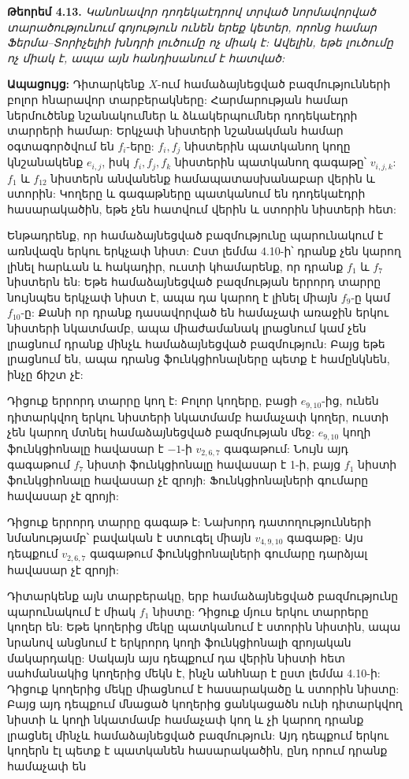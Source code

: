 \documentclass[12pt,a4paper]{article}
\numberwithin{equation}{section}
\numberwithin{figure}{section}
\begin{document}
\textbf{Թեորեմ 4.13.} \textit{Կանոնավոր դոդեկաէդրով տրված նորմավորված տարածությունում գոյություն ունեն երեք կետեր, որոնց համար Ֆերմա--Տորիչելիի խնդրի լուծումը ոչ միակ է: Ավելին, եթե լուծումը ոչ միակ է, ապա այն հանդիսանում է հատված:}

\textbf{Ապացույց:} Դիտարկենք $X$-ում համաձայնեցված բազմությունների բոլոր հնարավոր տարբերակները: Հարմարության համար ներմուծենք նշանակումներ և ձևակերպումներ դոդեկաէդրի տարրերի համար: Երկչափ նիստերի նշանակման համար օգտագործվում են $f_i$-երը: $f_i, f_j$ նիստերին պատկանող կողը կնշանակենք $e_{i,j}$, իսկ $f_i, f_j, f_k$ նիստերին պատկանող գագաթը՝ $v_{i,j,k}$: $f_1$ և $f_{12}$ նիստերն անվանենք համապատասխանաբար վերին և ստորին: Կողերը և գագաթները պատկանում են դոդեկաէդրի հասարակածին, եթե չեն հատվում վերին և ստորին նիստերի հետ:

Ենթադրենք, որ համաձայնեցված բազմությունը պարունակում է առնվազն երկու երկչափ նիստ: Ըստ լեմմա 4.10-ի՝ դրանք չեն կարող լինել հարևան և հակադիր, ուստի կհամարենք, որ դրանք $f_1$ և $f_7$ նիստերն են: Եթե համաձայնեցված բազմության երրորդ տարրը նույնպես երկչափ նիստ է, ապա դա կարող է լինել միայն $f_9$-ը կամ $f_{10}$-ը: Քանի որ դրանք դասավորված են համաչափ առաջին երկու նիստերի նկատմամբ, ապա միաժամանակ լրացնում կամ չեն լրացնում դրանք մինչև համաձայնեցված բազմություն: Բայց եթե լրացնում են, ապա դրանց ֆունկցիոնալները պետք է համընկնեն, ինչը ճիշտ չէ:

Դիցուք երրորդ տարրը կող է: Բոլոր կողերը, բացի $e_{9,10}$-ից, ունեն դիտարկվող երկու նիստերի նկատմամբ համաչափ կողեր, ուստի չեն կարող մտնել համաձայնեցված բազմության մեջ: $e_{9,10}$ կողի ֆունկցիոնալը հավասար է $-1$-ի $v_{2,6,7}$ գագաթում: Նույն այդ գագաթում $f_7$ նիստի ֆունկցիոնալը հավասար է 1-ի, բայց $f_1$ նիստի ֆունկցիոնալը հավասար չէ զրոյի: Ֆունկցիոնալների գումարը հավասար չէ զրոյի:

Դիցուք երրորդ տարրը գագաթ է: Նախորդ դատողությունների նմանությամբ՝ բավական է ստուգել միայն $v_{4,9,10}$ գագաթը: Այս դեպքում $v_{2,6,7}$ գագաթում ֆունկցիոնալների գումարը դարձյալ հավասար չէ զրոյի:

Դիտարկենք այն տարբերակը, երբ համաձայնեցված բազմությունը պարունակում է միակ $f_1$ նիստը: Դիցուք մյուս երկու տարրերը կողեր են: Եթե կողերից մեկը պատկանում է ստորին նիստին, ապա նրանով անցնում է երկրորդ կողի ֆունկցիոնալի զրոյական մակարդակը: Սակայն այս դեպքում դա վերին նիստի հետ սահմանակից կողերից մեկն է, ինչն անհնար է ըստ լեմմա 4.10-ի: Դիցուք կողերից մեկը միացնում է հասարակածը և ստորին նիստը: Բայց այդ դեպքում մնացած կողերից ցանկացածն ունի դիտարկվող նիստի և կողի նկատմամբ համաչափ կող և չի կարող դրանք լրացնել մինչև համաձայնեցված բազմություն: Այդ դեպքում երկու կողերն էլ պետք է պատկանեն հասարակածին, ընդ որում դրանք համաչափ են
\end{document}
